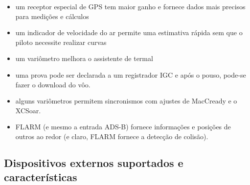\begin{itemize}
\item um receptor especial de GPS tem maior ganho e fornece dados mais precisos para medições e cálculos
\item um indicador de velocidade do ar permite uma estimativa rápida sem que o piloto necessite realizar curvas
\item um variômetro melhora o assistente de termal
\item uma prova pode ser declarada a um registrador IGC e após o pouso, pode-se fazer o download do vôo. 
\item alguns variômetros permitem sincronismos com ajustes de MacCready e o XCSoar.
\item FLARM  (e mesmo a entrada ADS-B) fornece informações e posições de outros ao redor (e claro, FLARM fornece a detecção de colisão).
\end{itemize}

\subsection*{Dispositivos externos suportados e características}
\label{sec:supported-varios}

\newcommand{\y}[0]{{ $\surd$ }}
\noindent{}


